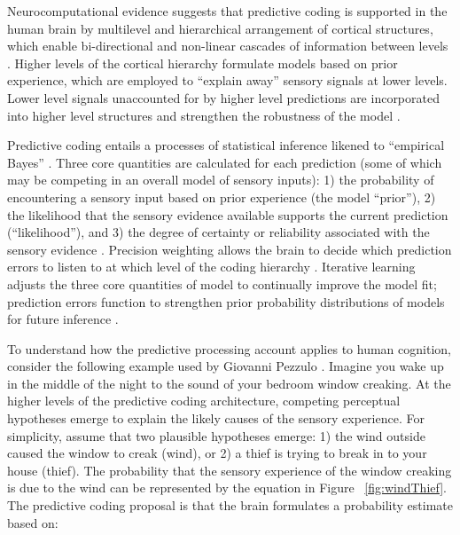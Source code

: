 \begin{CJK}{UTF8}{gbsn}
Neurocomputational evidence suggests that predictive coding is supported in the human brain by multilevel and hierarchical arrangement of cortical structures, which enable bi-directional and non-linear cascades of information between levels \citep{Feldman2010}.  Higher levels of the cortical hierarchy formulate models based on prior experience, which are employed to ``explain away'' sensory signals at lower levels.  Lower level signals unaccounted for by higher level predictions are incorporated into higher level structures and strengthen the robustness of the model \citep{Clark2013}.

Predictive coding entails a processes of statistical inference likened to ``empirical Bayes'' \citep{Clark2013}.  Three core quantities are calculated for each prediction (some of which may be competing in an overall model of sensory inputs): 1) the probability of encountering a sensory input based on prior experience (the model ``prior''), 2) the likelihood that the sensory evidence available supports the current prediction (``likelihood''), and 3) the degree of certainty or reliability associated with the sensory evidence \citep[which is proportional to the inverse variance of the model prior for each sensory input][]{Ernst2004,Clark2013}. Precision weighting allows the brain to decide which prediction errors to listen to at which level of the coding hierarchy \citep[be it high and conceptual or deep and sensory][]{Friston2015}.  Iterative learning adjusts the three core quantities of model to continually improve the model fit; prediction errors function to strengthen prior probability distributions of models for future inference \citep{Robbins1964}.

To understand how the predictive processing account applies to human cognition, consider the following example used by Giovanni Pezzulo \textcite{Pezzulo2013}.  Imagine you wake up in the middle of the night to the sound of your bedroom window creaking.  At the higher levels of the predictive coding architecture, competing perceptual hypotheses emerge to explain the likely causes of the sensory experience.  For simplicity, assume that two plausible hypotheses emerge: 1) the wind outside caused the window to creak (wind), or 2) a thief is trying to break in to your house (thief).  The probability that the sensory experience of the window creaking is due to the wind can be represented by the equation in Figure ~\ref{fig:windThief}.  The predictive coding proposal is that the brain formulates a probability estimate based on:


\end{CJK}
